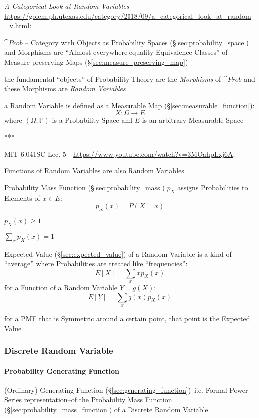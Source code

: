\asterism

\emph{A Categorical Look at Random Variables} -
\url{https://golem.ph.utexas.edu/category/2018/09/a_categorical_look_at_random_v.html}:

$\cat{Prob}$ -- Category with Objects as Probability Spaces
(\S\ref{sec:probability_space}) and Morphisms are ``Almost-everywhere-equality
Equivalence Classes'' of Measure-preserving Maps
(\S\ref{sec:measure_preserving_map})

the fundamental ``objects'' of Probability Theory are the \emph{Morphisms} of
$\cat{Prob}$ and these Morphisms are \emph{Random Variables}

a Random Variable is defined as a Measurable Map
(\S\ref{sec:measurable_function}):
\[
  X : \Omega \rightarrow E
\]
where $(\Omega,\mathbb{P})$ is a Probability Space and $E$ is an arbitrary
Measurable Space

***

MIT 6.041SC Lec. 5 - \url{https://www.youtube.com/watch?v=3MOahpLxj6A}:

Functions of Random Variables are also Random Variables

Probability Mass Function (\S\ref{sec:probability_mass}) $p_X$ assigns
Probabilities to Elements of $x \in E$:
\[
  p_X(x) = P(X = x)
\]

$p_X(x) \geq 1$

$\sum_x p_X(x) = 1$

Expected Value (\S\ref{sec:expected_value}) of a Random Variable is a kind of
``average'' where Probabilities are treated like ``frequencies'':
\[
  E[X] = \sum_x xp_X(x)
\]
for a Function of a Random Variable $Y = g(X)$:
\[
  E[Y] = \sum_x g(x)p_X(x)
\]

for a PMF that is Symmetric around a certain point, that point is the Expected
Value




\subsubsection{Discrete Random Variable}\label{sec:discrete_random_variable}

\paragraph{Probability Generating Function}
\label{sec:probability_generating_function}\hfill

(Ordinary) Generating Function (\S\ref{sec:generating_function})--i.e. Formal
Power Series representation--of the Probability Mass Function
(\S\ref{sec:probability_mass_function}) of a Discrete Random Variable



